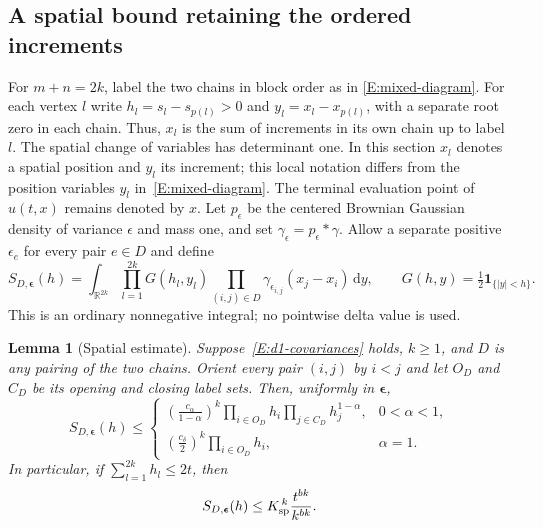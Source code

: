 \documentclass[12pt]{article}
\numberwithin{equation}{section}
\newtheorem{lemma}[theorem]{Lemma}
\theoremstyle{definition}
\newcommand{\R}{\mathbb{R}}
\newcommand{\ud}{\,\mathrm{d}}
\begin{document}
\subsection{A spatial bound retaining the ordered increments}

For $m+n=2k$, label the two chains in block order as in
\eqref{E:mixed-diagram}. For each vertex $l$ write
$h_l=s_l-s_{p(l)}>0$ and $y_l=x_l-x_{p(l)}$, with a separate root zero
in each chain. Thus, $x_l$ is the sum of increments in its own chain
up to label $l$. The spatial change of variables has determinant one.
In this section $x_l$ denotes a spatial position and $y_l$ its increment; this local
notation differs from the position variables $y_l$
in~\eqref{E:mixed-diagram}. The terminal evaluation point of $u(t,x)$
remains denoted by $x$.
Let $p_\epsilon$ be the centered Brownian Gaussian density of variance
$\epsilon$ and mass one, and set
$\gamma_\epsilon=p_\epsilon*\gamma$. Allow a separate positive
$\epsilon_e$ for every pair $e\in D$ and define
\[
  S_{D,\boldsymbol\epsilon}(h)
  =\int_{\R^{2k}}\prod_{l=1}^{2k}G(h_l,y_l)
  \prod_{(i,j)\in D}\gamma_{\epsilon_{i,j}}(x_j-x_i)\ud y,
  \qquad G(h,y)=\tfrac12\mathbf1_{\{|y|<h\}}.
\]
This is an ordinary nonnegative integral; no pointwise delta value is
used.

\begin{lemma}[Spatial estimate]\label{L:d1-spatial}
  Suppose~\eqref{E:d1-covariances} holds, $k\ge1$, and $D$ is any
  pairing of the two chains. Orient every pair $(i,j)$ by $i<j$ and
  let $O_D$ and $C_D$ be its opening and closing label sets. Then,
  uniformly in $\boldsymbol\epsilon$,
  \begin{equation}\label{E:d1-spatial-product}
    S_{D,\boldsymbol\epsilon}(h)\le
    \begin{cases}
      \displaystyle\left(\frac{c_\alpha}{1-\alpha}\right)^k
      \prod_{i\in O_D}h_i\prod_{j\in C_D}h_j^{1-\alpha},
      &0<\alpha<1,\\[2mm]
      \displaystyle\left(\frac{c_\delta}{2}\right)^k
      \prod_{i\in O_D}h_i,&\alpha=1.
    \end{cases}
  \end{equation}
  In particular, if $\sum_{l=1}^{2k}h_l\le2t$, then
  \begin{equation}\label{E:d1-spatial-max}
    S_{D,\boldsymbol\epsilon}(h)
    \le K_{\rm sp}^{\,k}\frac{t^{bk}}{k^{bk}}.
  \end{equation}
\end{lemma}
\end{document}
